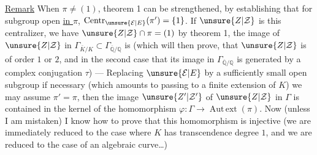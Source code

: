 \uline{Remark} When $\pi\neq(1)$,  theorem 1 can be strengthened,  by establishing that for  subgroup  open \uline{in $\pi$}, $\operatorname{Centr}_{\unsure{\mathcal E|E}}(\pi')=\{1\}$. If $\unsure{Z|\mathcal Z}$ is this centralizer, we have $\unsure{Z|\mathcal Z}\cap\pi=(1)$ by theorem 1,  the image of $\unsure{Z|\mathcal Z}$ in $\Gamma_{\bar K/K}\subset\Gamma_{\overline{\mathbb Q}/\mathbb Q}$ is  (which will  then prove, that $\unsure{Z|\mathcal Z}$ is of order $1$ or $2$, and in the second case that its image in $\Gamma_{\overline{\mathbb Q}/\mathbb Q}$ is  generated by a complex conjugation $\tau$) --- Replacing $\unsure{\mathcal E|E}$ by a sufficiently small open subgroup if necessary (which amounts to passing to a finite extension of $K$) we may assume $\pi'=\pi$, then the image $\unsure{Z'|\mathcal Z'}$ of $\unsure{Z|\mathcal Z}$ in $\Gamma$ is contained in the kernel of the homomorphism $\varphi:\Gamma\longrightarrow\operatorname{Aut\,ext}(\pi)$. Now (unless I am mistaken) I know how to prove that this homomorphism is injective (we are immediately reduced to the case where $K$ has transcendence degree $1$, and we are reduced to the case  of an algebraic curve\ldots)
